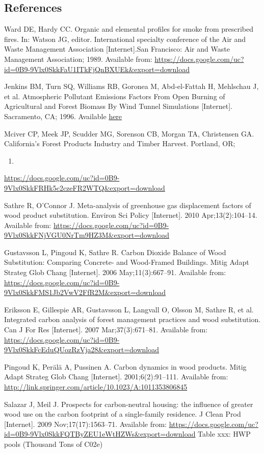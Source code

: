 \documentclass[a4paper]{article}
\begin{document}
\subsection{References}
\label{sec:orgheadline12}

Ward DE, Hardy CC. Organic and elemental profiles for smoke from
   prescribed fires. In: Watson JG, editor. International specialty
   conference of the Air and Waste Management Association
   [Internet].San Francisco: Air and Waste Management
   Association; 1989. Available from:
   \url{https://docs.google.com/uc?id=0B9-9Vlx0SkkFaU1ITkFjQnBXUEk&export=download}

Jenkins BM, Turn SQ, Williams RB, Goronea M, Abd-el-Fattah H,
   Mehlschau J, et al. Atmospheric Pollutant Emissions Factors From Open
   Burning of Agricultural and Forest Biomass By Wind Tunnel Simulations
   [Internet]. Sacramento, CA; 1996. Available
   \href{https://docs.google.com/uc?id=0B9-9Vlx0SkkFN1dQVjFkOXI1eVE&export=download}{here}

Mciver CP, Meek JP, Scudder MG, Sorenson CB, Morgan TA, Christensen GA.
California's Forest Products Industry and Timber Harvest. Portland, OR;
\begin{enumerate}
\item
\end{enumerate}
\url{https://docs.google.com/uc?id=0B9-9Vlx0SkkFRHk5c2czeFR2WTQ&export=download}

Sathre R, O'Connor J. Meta-analysis of greenhouse gas displacement
factors of wood product substitution. Environ Sci Policy [Internet].
2010 Apr;13(2):104--14. Available from:
\url{https://docs.google.com/uc?id=0B9-9Vlx0SkkFNjVGU0NrTm9HZ3M&export=download}

Gustavsson L, Pingoud K, Sathre R. Carbon Dioxide Balance of Wood
Substitution: Comparing Concrete- and Wood-Framed Buildings. Mitig Adapt
Strateg Glob Chang [Internet]. 2006 May;11(3):667--91. Available from:
\url{https://docs.google.com/uc?id=0B9-9Vlx0SkkFMS1Jb2VwV2FfR2M&export=download}

Eriksson E, Gillespie AR, Gustavsson L, Langvall O, Olsson M, Sathre R,
et al. Integrated carbon analysis of forest management practices and
wood substitution. Can J For Res [Internet]. 2007 Mar;37(3):671--81.
Available from:
\url{https://docs.google.com/uc?id=0B9-9Vlx0SkkFcEduQUozRzVja28&export=download}

Pingoud K, Perälä A, Pussinen A. Carbon dynamics in wood products. Mitig
Adapt Strateg Glob Chang [Internet]. 2001;6(2):91--111. Available from:
\url{http://link.springer.com/article/10.1023/A:1011353806845}

Salazar J, Meil J. Prospects for carbon-neutral housing: the influence
of greater wood use on the carbon footprint of a single-family
residence. J Clean Prod [Internet]. 2009 Nov;17(17):1563--71. Available
from:
\url{https://docs.google.com/uc?id=0B9-9Vlx0SkkFQTByZEU1eWtHZWs&export=download}
Table xxx: HWP pools (Thousand Tons of C02e)



\end{document}
